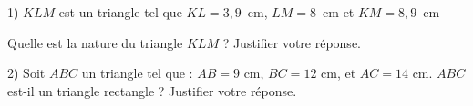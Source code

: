 \begin{minipage}{0.99\linewidth}

\exo


1) $KLM$ est un triangle tel que $KL=3,9$~cm, $LM=$8~cm et $KM=8,9$~cm \par 

Quelle est la nature du triangle $KLM$ ? Justifier votre réponse.

2) Soit $ABC$ un triangle tel que : $AB=9$ cm, $BC=12$ cm, et $AC=14$ cm. $ABC$ est-il un triangle rectangle ? Justifier votre réponse.

\end{minipage}

\vspace{0.5cm}